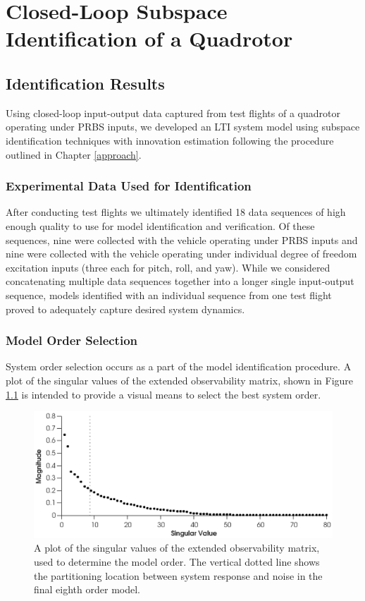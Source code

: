 \chapter{Closed-Loop Subspace Identification of a Quadrotor}\label{results}
\section{Identification Results}
Using closed-loop input-output data captured from test flights of a quadrotor operating under PRBS inputs, we developed an LTI system model using subspace identification techniques with innovation estimation following the procedure outlined in Chapter \ref{approach}.

\subsection{Experimental Data Used for Identification}
After conducting test flights we ultimately identified 18 data sequences of high enough quality to use for model identification and verification. Of these sequences, nine were collected with the vehicle operating under PRBS inputs and nine were collected with the vehicle operating under individual degree of freedom  excitation inputs (three each for pitch, roll, and yaw). While we considered concatenating multiple data sequences together into a longer single input-output sequence, models identified with an individual sequence from one test flight proved to adequately capture desired system dynamics.


\subsection{Model Order Selection}
System order selection occurs as a part of the model identification procedure. A plot of the singular values of the extended observability matrix, shown in Figure \ref{singular_values} is intended to provide a visual means to select the best system order. 
\begin{figure}[hbt!]
	\centering
	\includegraphics{../fig/singular_values_parsim.eps}
	\caption{A plot of the singular values of the extended observability matrix, used to determine the model order. The vertical dotted line shows the partitioning location between system response and noise in the final eighth order model.}
	\label{singular_values}
\end{figure}

